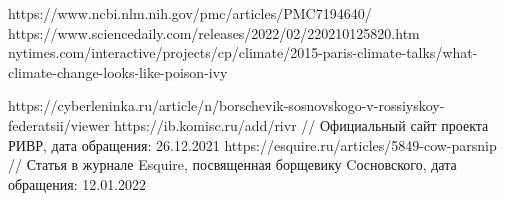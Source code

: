 
\begin{thebibliography}{99}
	https://www.ncbi.nlm.nih.gov/pmc/articles/PMC7194640/
	https://www.sciencedaily.com/releases/2022/02/220210125820.htm
	nytimes.com/interactive/projects/cp/climate/2015-paris-climate-talks/what-climate-change-looks-like-poison-ivy
	
	https://cyberleninka.ru/article/n/borschevik-sosnovskogo-v-rossiyskoy-federatsii/viewer
	https://ib.komisc.ru/add/rivr // Официальный сайт проекта РИВР, дата обращения: 26.12.2021
	https://esquire.ru/articles/5849-cow-parsnip // Статья в журнале Esquire, посвященная борщевику Cосновского, дата обращения: 12.01.2022
\end{thebibliography}
